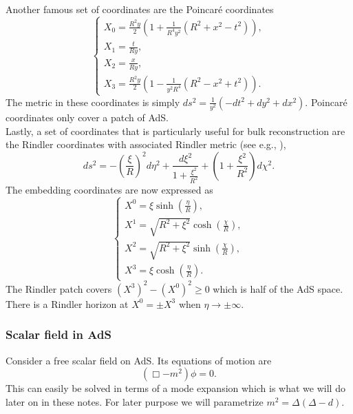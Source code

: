 \documentclass{PoS}
\newcommand{\LF}{\left(}
\newcommand{\RF}{\right)}
\begin{document}
 Another famous set of coordinates are the Poincar\'e coordinates
\begin{equation}
\left\{ \begin{matrix}
X_0 = \frac{R^2 y}{2} \LF 1+ \frac{1}{R^4 y^2} \LF R^2 +x^2-t^2\RF\RF,\\
X_1 = \frac{t}{Ry},\\
X_2 = \frac{x}{Ry} ,\\
X_3 = \frac{R^2y}{2} \LF 1- \frac{1}{y^2 R^4}\LF R^2-x^2+t^2\RF\RF.
\end{matrix}
\right.
\end{equation}
The metric in these coordinates is simply $ds^2 = \frac{1}{y^2} \LF -dt^2 +dy^2+dx^2\RF$. Poincar\'e coordinates only cover a patch of AdS.\\

Lastly, a set of coordinates that is particularly useful for bulk reconstruction are the Rindler coordinates with associated Rindler metric (see e.g., \cite{Parikh:2012kg}),
\begin{equation}
ds^2 = -\LF \frac{\xi}{R}\RF^2 d\eta^2+ \frac{d\xi^2}{1+ \frac{\xi^2}{R^2}} + \LF 1+ \frac{\xi^2}{R^2}\RF d\chi^2.
\end{equation}
The embedding coordinates are now expressed as 
\begin{equation}
\left\{ 
\begin{matrix}
X^0 = \xi \sinh\LF \frac{\eta}{R}\RF,\\
X^1 = \sqrt{R^2+\xi^2}\cosh\LF \frac{\chi}{R}\RF,\\
X^2 = \sqrt{R^2+\xi^2}\sinh\LF \frac{\chi}{R}\RF,\\
X^3 = \xi \cosh\LF \frac{\eta}{R}\RF.
\end{matrix}
\right.
\end{equation}
The Rindler patch covers $(X^3)^2-(X^0)^2\geq 0$ which is half of the AdS space. There is a Rindler horizon at $X^0=\pm X^3$ when $\eta\rightarrow \pm \infty$.
\subsubsection{Scalar field in AdS}
Consider a free scalar field on AdS. Its equations of motion are
\begin{equation}
\LF \Box - m^2\RF \phi = 0.
\end{equation}
This can easily be solved in terms of a mode expansion which is what we will do later on in these notes. For later purpose we will parametrize $m^2 = \Delta (\Delta -d)$.\\
\end{document}
